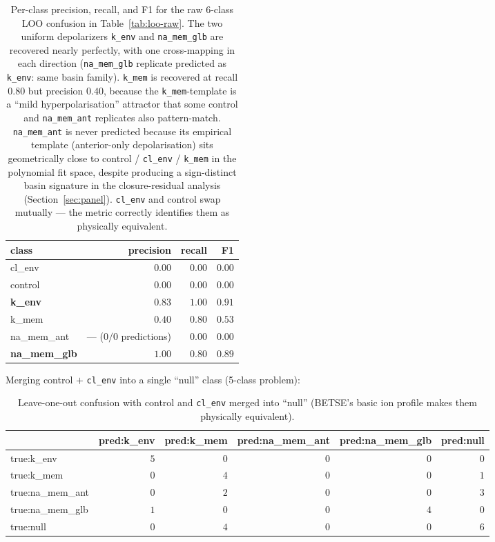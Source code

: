 \documentclass[11pt,a4paper]{article}
\begin{document}
\begin{table}[h]\centering\small
\caption{Per-class precision, recall, and F1 for the raw 6-class LOO confusion in Table~\ref{tab:loo-raw}. The two uniform depolarizers \texttt{k\_env} and \texttt{na\_mem\_glb} are recovered nearly perfectly, with one cross-mapping in each direction (\texttt{na\_mem\_glb} replicate predicted as \texttt{k\_env}: same basin family). \texttt{k\_mem} is recovered at recall $0.80$ but precision $0.40$, because the \texttt{k\_mem}-template is a ``mild hyperpolarisation'' attractor that some control and \texttt{na\_mem\_ant} replicates also pattern-match. \texttt{na\_mem\_ant} is never predicted because its empirical template (anterior-only depolarisation) sits geometrically close to control / \texttt{cl\_env} / \texttt{k\_mem} in the polynomial fit space, despite producing a sign-distinct basin signature in the closure-residual analysis (Section~\ref{sec:panel}). \texttt{cl\_env} and control swap mutually --- the metric correctly identifies them as physically equivalent.}\label{tab:loo-perclass}
\begin{tabular}{lrrr}\toprule
class & precision & recall & F1 \\
\midrule
cl\_env                 & $0.00$ & $0.00$ & $0.00$ \\
control                 & $0.00$ & $0.00$ & $0.00$ \\
\textbf{k\_env}         & $\mathbf{0.83}$ & $\mathbf{1.00}$ & $\mathbf{0.91}$ \\
k\_mem                  & $0.40$ & $0.80$ & $0.53$ \\
na\_mem\_ant            & --- ($0/0$ predictions) & $0.00$ & $0.00$ \\
\textbf{na\_mem\_glb}   & $\mathbf{1.00}$ & $\mathbf{0.80}$ & $\mathbf{0.89}$ \\
\bottomrule\end{tabular}
\end{table}

Merging control $+$ \texttt{cl\_env} into a single ``null'' class (5-class problem):

\begin{table}[h]\centering\small
\caption{Leave-one-out confusion with control and \texttt{cl\_env} merged into ``null'' (BETSE's basic ion profile makes them physically equivalent).}\label{tab:loo-merged}
\begin{tabular}{lrrrrr}\toprule
                  & pred:k\_env & pred:k\_mem & pred:na\_mem\_ant & pred:na\_mem\_glb & pred:null \\
\midrule
true:k\_env       & $5$ & $0$ & $0$ & $0$ & $0$ \\
true:k\_mem       & $0$ & $4$ & $0$ & $0$ & $1$ \\
true:na\_mem\_ant & $0$ & $2$ & $0$ & $0$ & $3$ \\
true:na\_mem\_glb & $1$ & $0$ & $0$ & $4$ & $0$ \\
true:null         & $0$ & $4$ & $0$ & $0$ & $6$ \\
\bottomrule\end{tabular}
\end{table}
\end{document}

